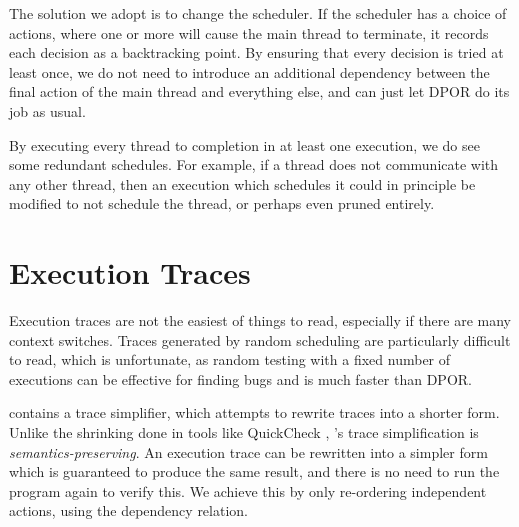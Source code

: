 The solution we adopt is to change the scheduler.  If the scheduler
has a choice of actions, where one or more will cause the main thread
to terminate, it records each decision as a backtracking point.  By
ensuring that every decision is tried at least once, we do not need to
introduce an additional dependency between the final action of the
main thread and everything else, and can just let DPOR do its job as
usual.

By executing every thread to completion in at least one execution, we
do see some redundant schedules.  For example, if a thread does not
communicate with any other thread, then an execution which schedules
it could in principle be modified to not schedule the thread, or
perhaps even pruned entirely.

\section{Execution Traces}
\label{sec:dejafu-traces}

Execution traces are not the easiest of things to read, especially if
there are many context switches.  Traces generated by random
scheduling are particularly difficult to read, which is unfortunate,
as random testing with a fixed number of executions can be effective
for finding bugs and is much faster than DPOR.

\dejafu{} contains a trace simplifier, which attempts to rewrite
traces into a shorter form.  Unlike the shrinking done in tools like
QuickCheck \parencite{claessen2000}, \dejafu{}'s trace simplification is
\emph{semantics-preserving}.  An execution trace can be rewritten into
a simpler form which is guaranteed to produce the same result, and
there is no need to run the program again to verify this.  We achieve
this by only re-ordering independent actions, using the dependency
relation.

